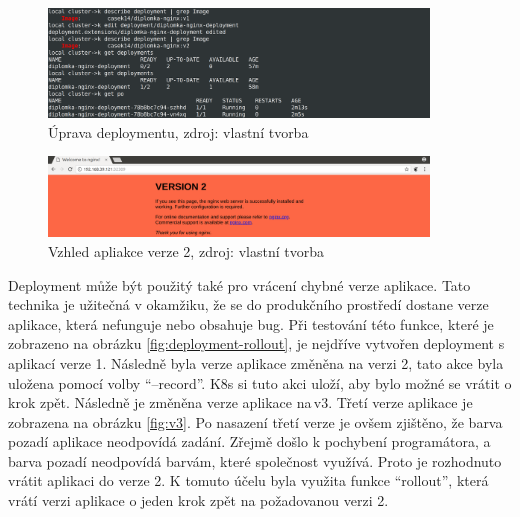 \begin{figure}[H]
  \begin{centering}
    
	  \includegraphics[width=0.9\textwidth]{images/deployment-update.png}
    \par
	  \caption{Úprava deploymentu\label{fig:update-deployment}, zdroj: vlastní tvorba}
    \end{centering}
\end{figure}

\begin{figure}[H]
  \begin{centering}
    
	  \includegraphics[width=0.9\textwidth]{images/v2.png}
    \par
	  \caption{Vzhled apliakce verze 2\label{fig:v2}, zdroj: vlastní tvorba}
    \end{centering}
\end{figure}
Deployment může být použitý také pro vrácení chybné verze aplikace. Tato technika je užitečná v okamžiku, že se do produkčního prostředí dostane verze aplikace, která nefunguje nebo obsahuje bug. Při testování této funkce, které je zobrazeno na obrázku \ref{fig:deployment-rollout}, je nejdříve vytvořen deployment s aplikací verze 1. Následně byla verze aplikace změněna na verzi 2, tato akce byla uložena pomocí volby “--record”. K8s si tuto akci uloží, aby bylo možné se vrátit o krok zpět. Následně je změněna verze aplikace na\,v3. Třetí verze aplikace je zobrazena na obrázku \ref{fig:v3}. Po nasazení třetí verze je ovšem zjištěno, že barva pozadí aplikace neodpovídá zadání. Zřejmě došlo k pochybení programátora, a barva pozadí neodpovídá barvám, které společnost využívá. Proto je rozhodnuto vrátit aplikaci do verze 2. K tomuto účelu byla využita funkce “rollout”, která vrátí verzi aplikace o jeden krok zpět na požadovanou verzi 2.

